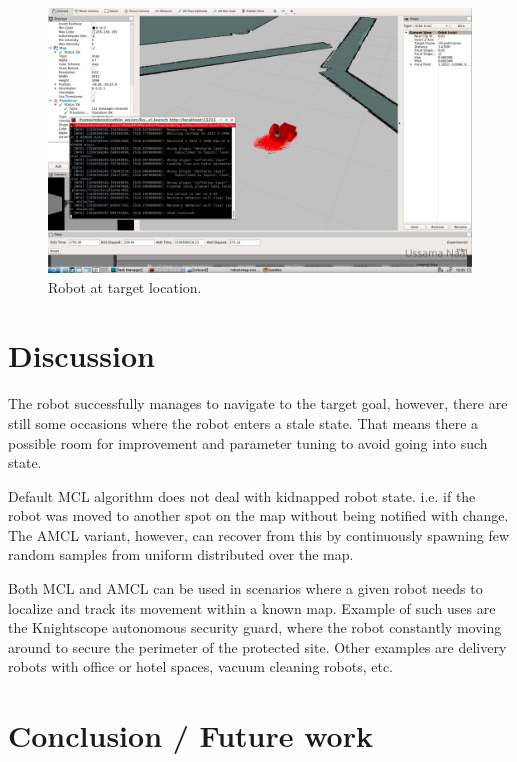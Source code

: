 \documentclass[10pt,journal,compsoc]{IEEEtran}
\begin{document}
\begin{figure}[thpb]
      \centering
      \includegraphics[width=\linewidth]{robot-at-goal.png}
      \caption{Robot at target location.}
      \label{fig:network-training}
\end{figure}

\section{Discussion}

The robot successfully manages to navigate to the target goal, however, there are still some occasions where the robot enters a stale state. That means there a possible room for improvement and parameter tuning to avoid going into such state.

Default MCL algorithm does not deal with kidnapped robot state. i.e. if the robot was moved to another spot on the map without being notified with change. The AMCL variant, however, can recover from this by continuously spawning few random samples from uniform distributed over the map.

Both MCL and AMCL can be used in scenarios where a given robot needs to localize and track its movement within a known map. Example of such uses are the Knightscope \cite{knightscope} autonomous security guard, where the robot constantly moving around to secure the perimeter of the protected site. Other examples are delivery robots with office or hotel spaces, vacuum cleaning robots, etc.

\section{Conclusion / Future work}
\end{document}

